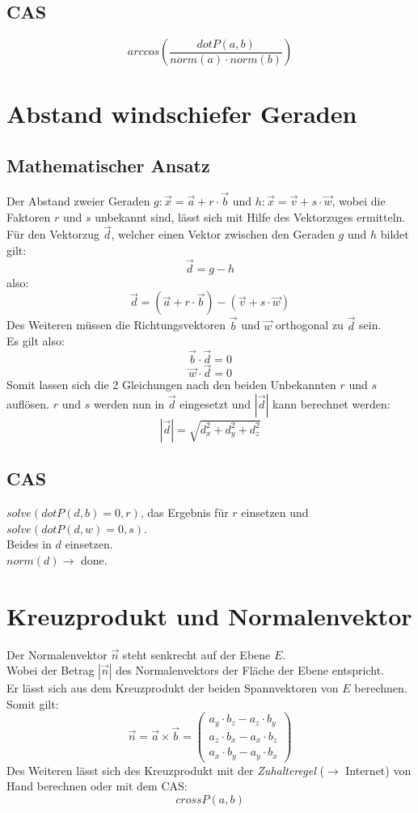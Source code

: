 \documentclass[a4paper,12pt]{article}
\begin{document}
\subsection{CAS}
$$arccos(\frac{dotP(a, b)}{norm(a) \cdot norm(b)})$$
\pagebreak
\section{Abstand windschiefer Geraden}
\subsection{Mathematischer Ansatz}
Der Abstand zweier Geraden $g : \vec{x} = \vec{a} + r \cdot \vec{b}$ und $h : \vec{x} = \vec{v} + s \cdot \vec{w}$, wobei die Faktoren $r$ und $s$ unbekannt sind, lässt sich mit Hilfe des Vektorzuges ermitteln.\\
Für den Vektorzug $\vec{d}$, welcher einen Vektor zwischen den Geraden $g$ und $h$ bildet gilt:
$$\vec{d} = g - h$$
also:
$$\vec{d} = (\vec{a} + r \cdot \vec{b}) - (\vec{v} + s \cdot \vec{w})$$
Des Weiteren müssen die Richtungsvektoren $\vec{b}$ und $\vec{w}$ orthogonal zu $\vec{d}$ sein.\\
Es gilt also:
$$\vec{b} \cdot \vec{d} = 0$$
$$\vec{w} \cdot \vec{d} = 0$$
Somit lassen sich die 2 Gleichungen nach den beiden Unbekannten $r$ und $s$ auflösen.
$r$ und $s$ werden nun in $\vec{d}$ eingesetzt und $|\vec{d}|$ kann berechnet werden:
$$|\vec{d}| = \sqrt{d_{x}^{2} + d_{y}^{2} + d_{z}^{2}}$$
\subsection{CAS}
$solve(dotP(d,b) = 0,r)$, das Ergebnis für $r$ einsetzen und\\
$solve(dotP(d,w) = 0,s)$.\\
Beides in $d$ einsetzen.\\
$norm(d) \rightarrow$ done.
\pagebreak
\section{Kreuzprodukt und Normalenvektor}
Der Normalenvektor $\vec{n}$ steht senkrecht auf der Ebene $E$.\\
Wobei der Betrag $|\vec{n}|$ des Normalenvektors der Fläche der Ebene entspricht.\\
Er lässt sich aus dem Kreuzprodukt der beiden Spannvektoren von $E$ berechnen. Somit gilt:
$$\vec{n} = \vec{a} \times \vec{b} = \begin{pmatrix}a_y \cdot b_z - a_z \cdot b_y\\a_z \cdot b_x - a_x \cdot b_z\\a_x \cdot b_y - a_y \cdot b_x\end{pmatrix}$$
Des Weiteren lässt sich des Kreuzprodukt mit der \textit{Zuhalteregel} ($\rightarrow$ Internet) von Hand berechnen oder mit dem CAS:\\
$$crossP(a,b)$$
\end{document}
